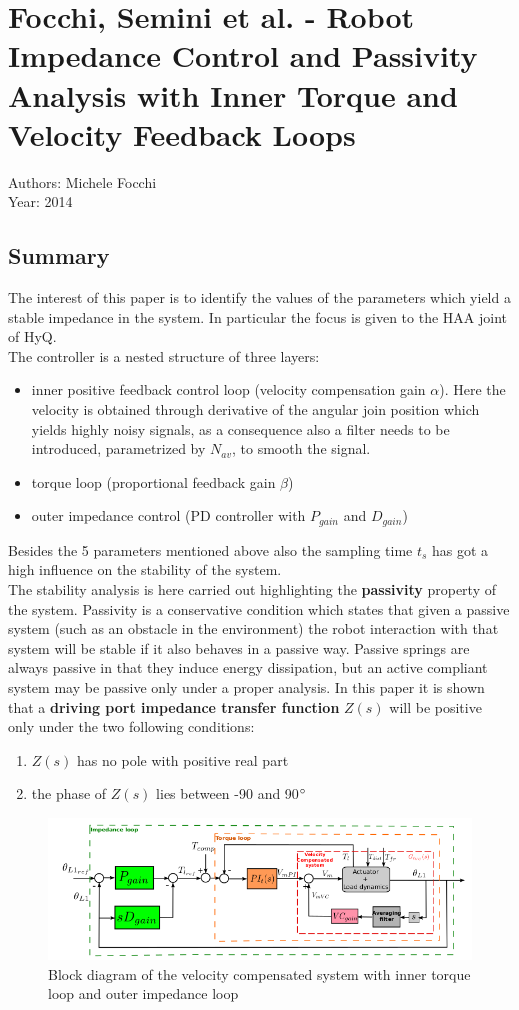 \section{Focchi, Semini et al. - Robot Impedance Control and Passivity Analysis
with Inner Torque and Velocity Feedback Loops \cite{SeminiFocchi2}}
Authors: Michele Focchi\\
Year: 2014
\subsection*{Summary}
The interest of this paper is to identify the values of the parameters which yield a stable impedance in the system. In particular the focus is given to the HAA joint of HyQ.\\
The controller is a nested structure of three layers:
\begin{itemize}
\item inner positive feedback control loop (velocity compensation gain $\alpha$). Here the velocity is obtained through derivative of the angular join position which yields highly noisy signals, as a consequence also a filter needs to be introduced, parametrized by $N_{av}$, to smooth the signal.
\item torque loop (proportional feedback gain $\beta$)
\item outer impedance control (PD controller with $P_{gain}$ and $D_{gain}$)
\end{itemize}
Besides the 5 parameters mentioned above also the sampling time $t_s$ has got a high influence on the stability of the system.\\
The stability analysis is here carried out highlighting the \textbf{passivity} property of the system. Passivity is a conservative condition which states that given a passive system (such as an obstacle in the environment) the robot interaction with that system will be stable if it also behaves in a passive way. Passive springs are always passive in that they induce energy dissipation, but an active compliant system may be passive only under a proper analysis. In this paper it is shown that a \textbf{driving port impedance transfer function} $Z(s)$ will be positive only under the two following conditions:
\begin{enumerate}
\item $Z(s)$ has no pole with positive real part
\item the phase of $Z(s)$ lies between -90 and 90$\degree$
\end{enumerate}
\begin{figure}
  \centering
  \includegraphics[width=120mm]{VelocityAndTorqueControl}
  \caption{Block diagram of the velocity compensated system with inner torque loop and outer impedance loop}
  \label{SpeedTorqueControl}
\end{figure}
